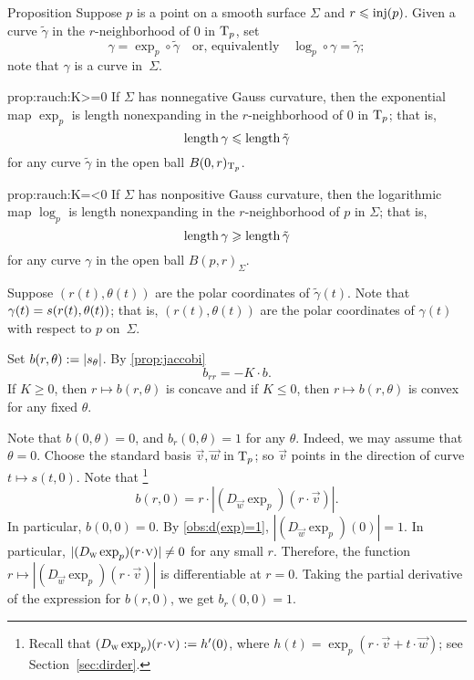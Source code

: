 \begin{thm}{Proposition}\label{prop:rauch}
Suppose $p$ is a point on a smooth surface $\Sigma$ and $r\leqslant \mathop{\rm inj}\nolimits(p)$.
Given a curve $\tilde\gamma$ in the $r$-neighborhood of $0$ in $\mathrm{T}_p$, set 
\[\gamma=\exp_p\circ\tilde\gamma
\quad
\text{or, equivalently}
\quad
\log_p\circ\gamma=\tilde\gamma
;\]
note that $\gamma$ is a curve in~$\Sigma$.

\begin{subthm}{prop:rauch:K>=0}
If $\Sigma$ has nonnegative Gauss curvature, then the exponential map $\exp_p$ is length nonexpanding in the $r$-neighborhood of $0$ in $\mathrm{T}_p$;
that is, 
\[\mathop{\rm length}\nolimits \gamma\leqslant \mathop{\rm length}\nolimits \tilde\gamma\]
for any curve $\tilde\gamma$ in the open ball $B(0,r)_{\mathrm{T}_p}$.
\end{subthm}

\begin{subthm}{prop:rauch:K=<0}
If $\Sigma$ has nonpositive Gauss curvature, then the logarithmic map $\log_p$ is length nonexpanding in the $r$-neighborhood of $p$ in $\Sigma$;
that is, 
\[\mathop{\rm length}\nolimits \gamma\geqslant \mathop{\rm length}\nolimits \tilde\gamma\]
for any curve $\gamma$ in the open ball $B(p,r)_{\Sigma}$.
\end{subthm}

\end{thm}

Suppose $(r(t),\theta(t))$ are the polar coordinates of $\tilde\gamma(t)$.
Note that $\gamma(t)\z=s(r(t),\theta(t))$; that is, $(r(t),\theta(t))$ are the polar coordinates of $\gamma(t)$ with respect to $p$ on~$\Sigma$.

Set $b(r,\theta)\mathrel{:=}|s_\theta|$.
By \ref{prop:jaccobi}
\[b_{rr}=-K\cdot b.\]
If $K\ge 0$, then $r\mapsto b(r,\theta)$ is concave
and
if $K\le 0$, then $r\mapsto b(r,\theta)$ is convex for any fixed $\theta$.

Note that $b(0,\theta)=0$, and $b_r(0,\theta)=1$ for any $\theta$.
Indeed, we may assume that $\theta=0$.
Choose the standard basis $\vec v,\vec w$ in $\mathrm{T}_p$; so $\vec v$ points in the direction of curve $t\mapsto s(t,0)$.
Note that%
\footnote{Recall that $(D_{\vec w}\exp_p)(r\cdot \vec v)\df h'(0)$, where $h(t)=\exp_p(r\cdot \vec v+t\cdot \vec w)$; see Section~\ref{sec:dirder}.}
\[b(r,0)=r\cdot |(D_{\vec w}\exp_p)(r\cdot \vec v)|.\]
In particular, $b(0,0)=0$.
By \ref{obs:d(exp)=1}, $|(D_{\vec w}\exp_p)(0)|=1$.
In particular, $|(D_{\vec w}\exp_p)(r\cdot \vec v)|\z\ne 0$ for any small $r$.
Therefore, the function $r\mapsto|(D_{\vec w}\exp_p)(r\cdot \vec v)|$ is differentiable at $r=0$.
Taking the partial derivative of the expression for $b(r,0)$, we get $b_r(0,0)=1$.

